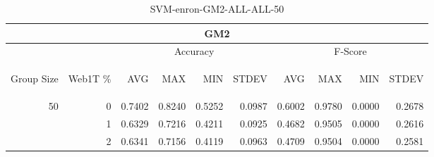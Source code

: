 \begin{center}
\begin{table}[htbp] 
 \begin{center}
\begin{tabular}{ | r | r | r | r | r | r | r | r | r | r |}
\hline
\multicolumn{10}{|c|}{GM2}\\
\hline
 & & \multicolumn{4}{|c|}{Accuracy} & \multicolumn{4}{|c|}{F-Score}\\ \cline{3-10}
\begin{sideways}Group Size\end{sideways} & \begin{sideways}Web1T \%\end{sideways} & \begin{sideways}AVG\end{sideways} & \begin{sideways}MAX\end{sideways} & \begin{sideways}MIN\end{sideways} & \begin{sideways}STDEV\end{sideways} & \begin{sideways}AVG\end{sideways} & \begin{sideways}MAX\end{sideways} & \begin{sideways}MIN\end{sideways} & \begin{sideways}STDEV\end{sideways}\\
\hline
\multirow{2}{*}{50}
 & 0 & 0.7402 & 0.8240 & 0.5252 & 0.0987 & 0.6002 & 0.9780 & 0.0000 & 0.2678\\ \cline{2-10}
 & 1 & 0.6329 & 0.7216 & 0.4211 & 0.0925 & 0.4682 & 0.9505 & 0.0000 & 0.2616\\ \cline{2-10}
 & 2 & 0.6341 & 0.7156 & 0.4119 & 0.0963 & 0.4709 & 0.9504 & 0.0000 & 0.2581\\ \cline{2-10}
\hline
\end{tabular}
\caption{SVM-enron-GM2-ALL-ALL-50}
\label{table:SVM-enron-GM2-ALL-ALL-50}
\end{center}
 \end{table}
\end{center}

